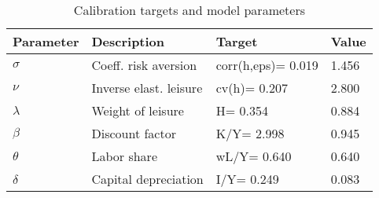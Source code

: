 \begin{table}[!htbp]
\centering
\caption{Calibration targets and model parameters}
\begin{tabular}{llll}
\toprule
Parameter & Description & Target & Value \\
\midrule
$\sigma$  & Coeff. risk aversion   & corr(h,eps)= 0.019 & 1.456 \\
$\nu$     & Inverse elast. leisure & cv(h)= 0.207       & 2.800 \\
$\lambda$ & Weight of leisure      & H= 0.354           & 0.884 \\
$\beta$   & Discount factor        & K/Y= 2.998         & 0.945 \\
$\theta$  & Labor share            & wL/Y= 0.640        & 0.640 \\
$\delta$  & Capital depreciation   & I/Y= 0.249         & 0.083 \\
\bottomrule
\end{tabular}
\end{table}
